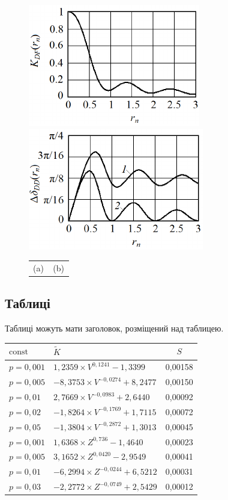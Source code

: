 \begin{multicols}{2}
\begin{figure}\centering
	\includegraphics[width=0.4\linewidth]{fig2a}
	~~~~~
	\includegraphics[width=0.4\linewidth]{fig2b}
	\begin{tabular}{p{0.49\linewidth}p{0.49\linewidth}}
		\centering (a) & \centering (b)  
	\end{tabular}	
	\label{fig2}%
\end{figure}



\subsection{Таблиці}

Таблиці можуть мати заголовок, розміщений над таблицею. 
\begin{Table}
	\begin{tabularx}{\linewidth}{|l|X|c|}
		\hline 
		\rule{0pt}{11pt} $\mathrm{const}$ & $\tilde{K}$ &  $S$\\ 
		\hline 
		\rule{0pt}{10pt}$p=0,001$& $1,2359\times V^{0,1241}-1,3399$ &  0,00158\\ 
		\hline 
		\rule{0pt}{10pt}$p=0,005$& $-8,3753\times V^{-0,0274}+8,2477$ &  0,00150\\ 
		\hline 
		\rule{0pt}{10pt}$p=0,01$&  $2,7669\times V^{-0,0983}+2,6440$&  0,00092\\ 
		\hline 
		\rule{0pt}{10pt}$p=0,02$&  $-1,8264\times V^{-0,1769}+1,7115$&  0,00072\\ 
		\hline 
		\rule{0pt}{10pt}$p=0,05$&  $-1,3804\times V^{-0,2872}+1,3013$&  0,00045\\ 
		\hline 
		\rule{0pt}{10pt}$p=0,001$&  $1,6368\times Z^{0,736}-1,4640$&  0,00023\\ 
		\hline 
		\rule{0pt}{10pt}$p=0,005$&  $3,1652\times Z^{0,0420}-2,9549$&  0,00041\\ 
		\hline 
		\rule{0pt}{10pt}$p=0,01$&  $-6,2994\times Z^{-0,0244}+6,5212$&  0,00031\\ 
		\hline 
		\rule{0pt}{10pt}$p=0,03$&  $-2,2772\times Z^{-0,0749}+2,5429$&  0,00012\\ 
		\hline 
	\end{tabularx} \label{radap1361tab1}
\end{Table}


\end{multicols}
